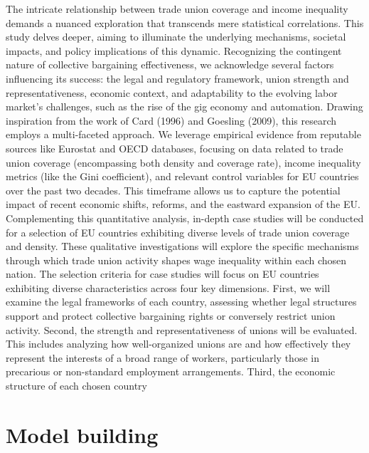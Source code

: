 \documentclass{article}
\begin{document}
The intricate relationship between trade union coverage and income inequality demands a nuanced exploration that transcends mere statistical correlations. This study delves deeper, aiming to illuminate the underlying mechanisms, societal impacts, and policy implications of this dynamic. Recognizing the contingent nature of collective bargaining effectiveness, we acknowledge several factors influencing its success: the legal and regulatory framework, union strength and representativeness, economic context, and adaptability to the evolving labor market's challenges, such as the rise of the gig economy and automation. Drawing inspiration from the work of Card (1996) and Goesling (2009), this research employs a multi-faceted approach. We leverage empirical evidence from reputable sources like Eurostat and OECD databases, focusing on data related to trade union coverage (encompassing both density and coverage rate), income inequality metrics (like the Gini coefficient), and relevant control variables for EU countries over the past two decades. This timeframe allows us to capture the potential impact of recent economic shifts, reforms, and the eastward expansion of the EU. Complementing this quantitative analysis, in-depth case studies will be conducted for a selection of EU countries exhibiting diverse levels of trade union coverage and density. These qualitative investigations will explore the specific mechanisms through which trade union activity shapes wage inequality within each chosen nation. The selection criteria for case studies will focus on EU countries exhibiting diverse characteristics across four key dimensions. First, we will examine the legal frameworks of each country, assessing whether legal structures support and protect collective bargaining rights or conversely restrict union activity. Second, the strength and representativeness of unions will be evaluated. This includes analyzing how well-organized unions are and how effectively they represent the interests of a broad range of workers, particularly those in precarious or non-standard employment arrangements. Third, the economic structure of each chosen country

\section{Model building}
\end{document}
